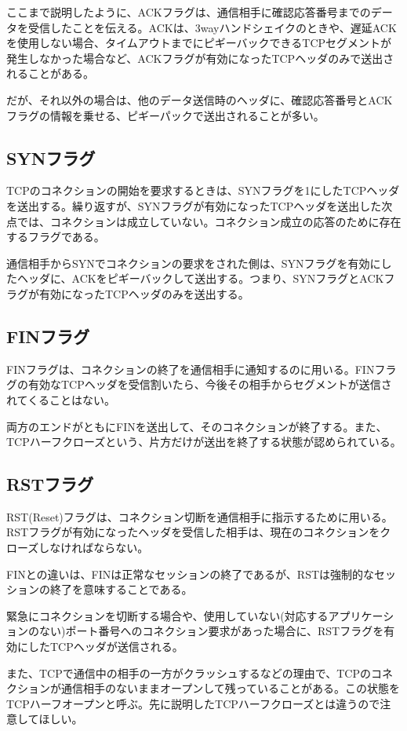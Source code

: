 ここまで説明したように、ACKフラグは、通信相手に確認応答番号までのデータを受信したことを伝える。ACKは、3wayハンドシェイクのときや、遅延ACKを使用しない場合、タイムアウトまでにピギーバックできるTCPセグメントが発生しなかった場合など、ACKフラグが有効になったTCPヘッダのみで送出されることがある。

だが、それ以外の場合は、他のデータ送信時のヘッダに、確認応答番号とACKフラグの情報を乗せる、ピギーパックで送出されることが多い。

\subsection{SYNフラグ}
TCPのコネクションの開始を要求するときは、SYNフラグを1にしたTCPヘッダを送出する。繰り返すが、SYNフラグが有効になったTCPヘッダを送出した次点では、コネクションは成立していない。コネクション成立の応答のために存在するフラグである。

通信相手からSYNでコネクションの要求をされた側は、SYNフラグを有効にしたヘッダに、ACKをピギーバックして送出する。つまり、SYNフラグとACKフラグが有効になったTCPヘッダのみを送出する。

\subsection{FINフラグ}
FINフラグは、コネクションの終了を通信相手に通知するのに用いる。FINフラグの有効なTCPヘッダを受信割いたら、今後その相手からセグメントが送信されてくることはない。

両方のエンドがともにFINを送出して、そのコネクションが終了する。また、TCPハーフクローズという、片方だけが送出を終了する状態が認められている。


\subsection{RSTフラグ}
RST(Reset)フラグは、コネクション切断を通信相手に指示するために用いる。RSTフラグが有効になったヘッダを受信した相手は、現在のコネクションをクローズしなければならない。

FINとの違いは、FINは正常なセッションの終了であるが、RSTは強制的なセッションの終了を意味することである。

緊急にコネクションを切断する場合や、使用していない(対応するアプリケーションのない)ポート番号へのコネクション要求があった場合に、RSTフラグを有効にしたTCPヘッダが送信される。

また、TCPで通信中の相手の一方がクラッシュするなどの理由で、TCPのコネクションが通信相手のないままオープンして残っていることがある。この状態をTCPハーフオープンと呼ぶ。先に説明したTCPハーフクローズとは違うので注意してほしい。

